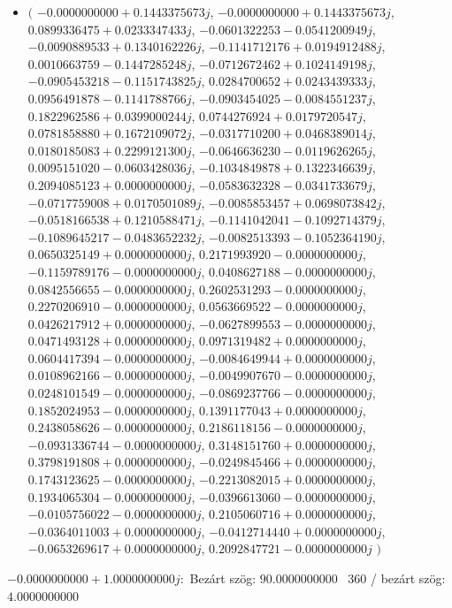 \documentclass[14pt,a4paper]{article}
\begin{document}
\begin{itemize}
\item
$\big($
$-0.0000000000+0.1443375673j$, $-0.0000000000+0.1443375673j$, $0.0899336475+0.0233347433j$, $-0.0601322253-0.0541200949j$, $-0.0090889533+0.1340162226j$, $-0.1141712176+0.0194912488j$, $0.0010663759-0.1447285248j$, $-0.0712672462+0.1024149198j$, $-0.0905453218-0.1151743825j$, $0.0284700652+0.0243439333j$, $0.0956491878-0.1141788766j$, $-0.0903454025-0.0084551237j$, $0.1822962586+0.0399000244j$, $0.0744276924+0.0179720547j$, $0.0781858880+0.1672109072j$, $-0.0317710200+0.0468389014j$, $0.0180185083+0.2299121300j$, $-0.0646636230-0.0119626265j$, $0.0095151020-0.0603428036j$, $-0.1034849878+0.1322346639j$, $0.2094085123+0.0000000000j$, $-0.0583632328-0.0341733679j$, $-0.0717759008+0.0170501089j$, $-0.0085853457+0.0698073842j$, $-0.0518166538+0.1210588471j$, $-0.1141042041-0.1092714379j$, $-0.1089645217-0.0483652232j$, $-0.0082513393-0.1052364190j$, $0.0650325149+0.0000000000j$, $0.2171993920-0.0000000000j$, $-0.1159789176-0.0000000000j$, $0.0408627188-0.0000000000j$, $0.0842556655-0.0000000000j$, $0.2602531293-0.0000000000j$, $0.2270206910-0.0000000000j$, $0.0563669522-0.0000000000j$, $0.0426217912+0.0000000000j$, $-0.0627899553-0.0000000000j$, $0.0471493128+0.0000000000j$, $0.0971319482+0.0000000000j$, $0.0604417394-0.0000000000j$, $-0.0084649944+0.0000000000j$, $0.0108962166-0.0000000000j$, $-0.0049907670-0.0000000000j$, $0.0248101549-0.0000000000j$, $-0.0869237766-0.0000000000j$, $0.1852024953-0.0000000000j$, $0.1391177043+0.0000000000j$, $0.2438058626-0.0000000000j$, $0.2186118156-0.0000000000j$, $-0.0931336744-0.0000000000j$, $0.3148151760+0.0000000000j$, $0.3798191808+0.0000000000j$, $-0.0249845466+0.0000000000j$, $0.1743123625-0.0000000000j$, $-0.2213082015+0.0000000000j$, $0.1934065304-0.0000000000j$, $-0.0396613060-0.0000000000j$, $-0.0105756022-0.0000000000j$, $0.2105060716+0.0000000000j$, $-0.0364011003+0.0000000000j$, $-0.0412714440+0.0000000000j$, $-0.0653269617+0.0000000000j$, $0.2092847721-0.0000000000j$
$\big)$
\end{itemize}
$-0.0000000000+1.0000000000j$:\
Bezárt szög: $90.0000000000$ \
360 / bezárt szög: $4.0000000000$\
\end{document}

